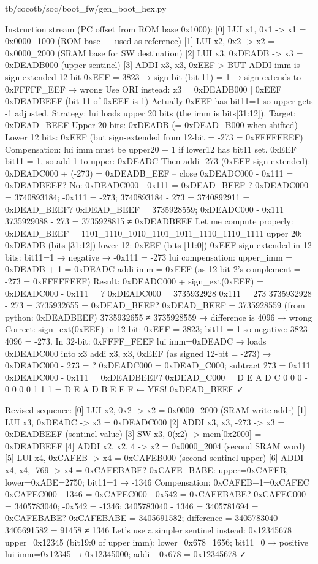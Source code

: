 \begin{relocated}{tb/cocotb/soc/boot_fw/gen_boot_hex.py}
\begin{textblock}
Instruction stream (PC offset from ROM base 0x1000):
[0]  LUI  x1, 0x1      -> x1 = 0x0000_1000  (ROM base — used as reference)
[1]  LUI  x2, 0x2      -> x2 = 0x0000_2000  (SRAM base for SW destination)
[2]  LUI  x3, 0xDEADB  -> x3 = 0xDEADB000   (upper sentinel)
[3]  ADDI x3, x3, 0xEEF->                    BUT ADDI imm is sign-extended 12-bit
0xEEF = 3823 → sign bit (bit 11) = 1 → sign-extends to 0xFFFFF_EEF → wrong
Use ORI instead: x3 = 0xDEADB000 | 0xEEF = 0xDEADBEEF (bit 11 of 0xEEF is 1)
Actually 0xEEF has bit11=1 so upper gets -1 adjusted.
Strategy: lui loads upper 20 bits (the imm is bits[31:12]).
Target: 0xDEAD_BEEF
Upper 20 bits: 0xDEADB (= 0xDEAD_B000 when shifted)
Lower 12 bits: 0xEEF  (but sign-extended from 12-bit = -273 = 0xFFFFFEEF)
Compensation:  lui imm must be upper20 + 1 if lower12 has bit11 set.
0xEEF bit11 = 1, so add 1 to upper: 0xDEADC
Then addi -273 (0xEEF sign-extended): 0xDEADC000 + (-273) = 0xDEADB_EEF -- close
0xDEADC000 - 0x111 = 0xDEADBEEF? No: 0xDEADC000 - 0x111 = 0xDEAD_BEEF ?
0xDEADC000 = 3740893184; -0x111 = -273; 3740893184 - 273 = 3740892911 = 0xDEAD_BEEF?
0xDEAD_BEEF = 3735928559; 0xDEADC000 - 0x111 = 3735929088 - 273 = 3735928815 ≠ 0xDEADBEEF
Let me compute properly:
0xDEAD_BEEF = 1101_1110_1010_1101_1011_1110_1110_1111
upper 20: 0xDEADB  (bits [31:12])
lower 12: 0xEEF    (bits [11:0])
0xEEF sign-extended in 12 bits: bit11=1 → negative → -0x111 = -273
lui compensation: upper_imm = 0xDEADB + 1 = 0xDEADC
addi imm = 0xEEF (as 12-bit 2's complement = -273 = 0xFFFFFEEF)
Result: 0xDEADC000 + sign_ext(0xEEF) = 0xDEADC000 - 0x111 = ?
0xDEADC000 = 3735932928
0x111 = 273
3735932928 - 273 = 3735932655 = 0xDEAD_BEEF?
0xDEAD_BEEF = 3735928559 (from python: 0xDEADBEEF)
3735932655 ≠ 3735928559 → difference is 4096 → wrong
Correct: sign_ext(0xEEF) in 12-bit: 0xEEF = 3823; bit11 = 1 so negative:
3823 - 4096 = -273. In 32-bit: 0xFFFF_FEEF
lui imm=0xDEADC → loads 0xDEADC000 into x3
addi x3, x3, 0xEEF (as signed 12-bit = -273) → 0xDEADC000 - 273 = ?
0xDEADC000 = 0xDEAD_C000; subtract 273 = 0x111
0xDEADC000 - 0x111 = 0xDEADBEEF?
0xDEAD_C000 = D E A D C 0 0 0
-           0 0 0 0 1 1 1
= D E A D B E E F  ← YES! 0xDEAD_BEEF ✓

Revised sequence:
[0]  LUI  x2, 0x2       -> x2 = 0x0000_2000  (SRAM write addr)
[1]  LUI  x3, 0xDEADC   -> x3 = 0xDEADC000
[2]  ADDI x3, x3, -273  -> x3 = 0xDEADBEEF  (sentinel value)
[3]  SW   x3, 0(x2)     -> mem[0x2000] = 0xDEADBEEF
[4]  ADDI x2, x2, 4     -> x2 = 0x0000_2004  (second SRAM word)
[5]  LUI  x4, 0xCAFEB   -> x4 = 0xCAFEB000   (second sentinel upper)
[6]  ADDI x4, x4, -769  -> x4 = 0xCAFEBABE?
0xCAFE_BABE: upper=0xCAFEB, lower=0xABE=2750; bit11=1 → -1346
Compensation: 0xCAFEB+1=0xCAFEC
0xCAFEC000 - 1346 = 0xCAFEC000 - 0x542 = 0xCAFEBABE?
0xCAFEC000 = 3405783040; -0x542 = -1346; 3405783040 - 1346 = 3405781694 = 0xCAFEBABE?
0xCAFEBABE = 3405691582; difference = 3405783040-3405691582 = 91458 ≠ 1346
Let's use a simpler sentinel instead: 0x12345678
upper=0x12345 (bit19:0 of upper imm); lower=0x678=1656; bit11=0 → positive
lui imm=0x12345 → 0x12345000; addi +0x678 = 0x12345678 ✓


\end{textblock}
\end{relocated}
